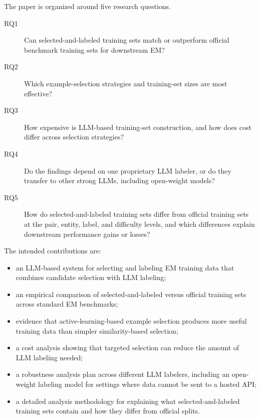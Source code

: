 The paper is organized around five research questions.

\begin{description}
  \item[RQ1] Can selected-and-labeled training sets match or outperform official benchmark training sets for downstream EM?
  \item[RQ2] Which example-selection strategies and training-set sizes are most effective?
  \item[RQ3] How expensive is LLM-based training-set construction, and how does cost differ across selection strategies?
  \item[RQ4] Do the findings depend on one proprietary LLM labeler, or do they transfer to other strong LLMs, including open-weight models?
  \item[RQ5] How do selected-and-labeled training sets differ from official training sets at the pair, entity, label, and difficulty levels, and which differences explain downstream performance gains or losses?
\end{description}

The intended contributions are:

\begin{itemize}
  \item an LLM-based system for selecting and labeling EM training data that combines candidate selection with LLM labeling;
  \item an empirical comparison of selected-and-labeled versus official training sets across standard EM benchmarks;
  \item evidence that active-learning-based example selection produces more useful training data than simpler similarity-based selection;
  \item a cost analysis showing that targeted selection can reduce the amount of LLM labeling needed;
  \item a robustness analysis plan across different LLM labelers, including an open-weight labeling model for settings where data cannot be sent to a hosted API;
  \item a detailed analysis methodology for explaining what selected-and-labeled training sets contain and how they differ from official splits.
\end{itemize}
